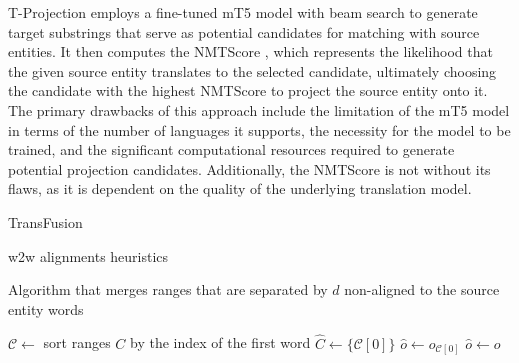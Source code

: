 T-Projection \cite{garcia-ferrero-etal-2023-projection} employs a fine-tuned mT5 \cite{xue-etal-2021-mt5}
model with beam search to generate target substrings that serve as potential candidates for matching
with source entities. It then computes the NMTScore \cite{vamvas_sennrich_2022_nmtscore}, which
represents the likelihood that the given source entity translates to the selected candidate, ultimately
choosing the candidate with the highest NMTScore to project the source entity onto it. The primary
drawbacks of this approach include the limitation of the mT5 model in terms of the number of languages
it supports, the necessity for the model to be trained, and the significant computational resources
required to generate potential projection candidates. Additionally, the NMTScore is not without its
flaws, as it is dependent on the quality of the underlying translation model.

TransFusion \cite{transfusion} 

w2w alignments heuristics \cite{garcia-ferrero-etal-2022-model}

\begin{algorithm}
  \caption{Algorithm that merges ranges that are separated by \( d \) non-aligned to the source entity words}
  \label{alg:merge}


  \( \mathcal{C} \gets \) sort ranges \(C\) by the index of the first word \;
  \( \hat{C} \gets \{ \mathcal{C}[0] \} \)  \;
  \( \hat{o} \gets o_{\mathcal{C}[0]} \) \;
  {
    \( \hat{o} \gets o \) \;
  }
\end{algorithm}

